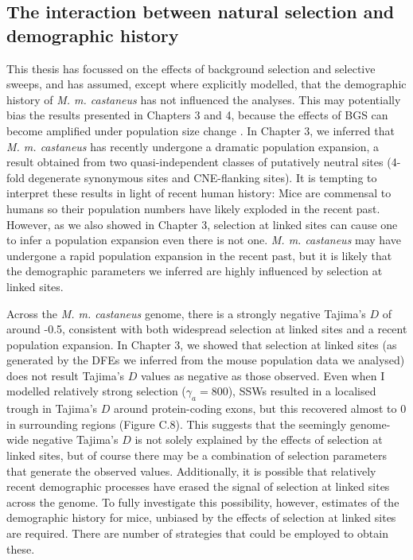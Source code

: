 \subsection{The interaction between natural selection and demographic history}

	This thesis has focussed on the effects of background selection and selective sweeps, and has assumed, except where explicitly modelled, that the demographic history of \textit{M. m. castaneus} has not influenced the analyses. This may potentially bias the results presented in Chapters 3 and 4, because the effects of BGS can become amplified under population size change \citep{RN397}. In Chapter 3, we inferred that \textit{M. m. castaneus} has recently undergone a dramatic population expansion, a result obtained from two quasi-independent classes of putatively neutral sites (4-fold degenerate synonymous sites and CNE-flanking sites). It is tempting to interpret these results in light of recent human history: Mice are commensal to humans so their population numbers have likely exploded in the recent past. However, as we also showed in Chapter 3, selection at linked sites can cause one to infer a population expansion even there is not one. \textit{M. m. castaneus} may have undergone a rapid population expansion in the recent past, but it is likely that the demographic parameters we inferred are highly influenced by selection at linked sites.
	
	Across the \textit{M. m. castaneus} genome, there is a strongly negative Tajima's $D$ of around -0.5, consistent with both widespread selection at linked sites and a recent population expansion. In Chapter 3, we showed that selection at linked sites (as generated by the DFEs we inferred from the mouse population data we analysed) does not result Tajima's $D$ values as negative as those observed. Even when I modelled relatively strong selection ($\gamma_a = 800$), SSWs resulted in a localised trough in Tajima's $D$ around protein-coding exons, but this recovered almost to 0 in surrounding regions (Figure C.8). This suggests that the seemingly genome-wide negative Tajima's $D$ is not solely explained by the effects of selection at linked sites, but of course there may be a combination of selection parameters that generate the observed values. Additionally, it is possible that relatively recent demographic processes have erased the signal of selection at linked sites across the genome. To fully investigate this possibility, however, estimates of the demographic history for mice, unbiased by the effects of selection at linked sites are required. There are number of strategies that could be employed to obtain these.

